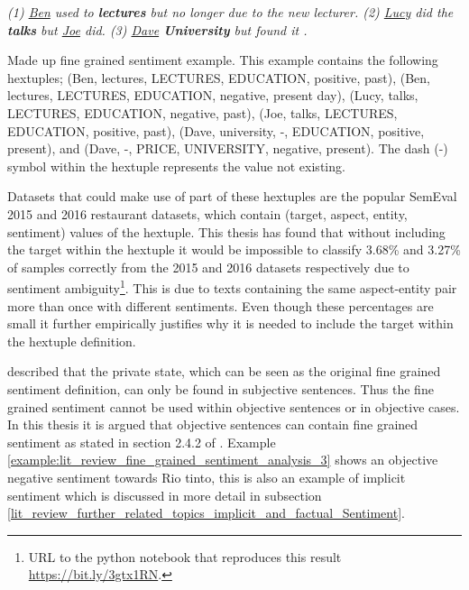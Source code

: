 \begin{example}
\textit{(1) \underline{Ben} used to  \textbf{lectures} but no longer due to the new lecturer. (2) \underline{Lucy} did  the \textbf{talks} but \underline{Joe} did. (3) \underline{Dave}  \textbf{University} but found it .}
\caption{Made up fine grained sentiment example. This example contains the following hextuples; (Ben, lectures, LECTURES, EDUCATION, positive, past), (Ben, lectures, LECTURES, EDUCATION, negative, present day), (Lucy, talks, LECTURES, EDUCATION, negative, past), (Joe, talks, LECTURES, EDUCATION, positive, past), (Dave, university, -, EDUCATION, positive, present), and (Dave, -, PRICE, UNIVERSITY, negative, present). The dash (-) symbol within the hextuple represents the value not existing.}
\label{example:lit_review_fine_grained_sentiment_analysis_2}
\end{example}

Datasets that could make use of part of these hextuples are the popular SemEval 2015 and 2016 restaurant datasets, which contain (target, aspect, entity, sentiment) values of the hextuple. This thesis has found that without including the target within the hextuple it would be impossible to classify 3.68\% and 3.27\% of samples correctly from the 2015 and 2016 datasets respectively due to sentiment ambiguity\footnote{URL to the python notebook that reproduces this result \url{https://bit.ly/3gtx1RN}.}. This is due to texts containing the same aspect-entity pair more than once with different sentiments. Even though these percentages are small it further empirically justifies why it is needed to include the target within the hextuple definition.

\citet{wiebe-1994-tracking} described that the private state, which can be seen as the original fine grained sentiment definition, can only be found in subjective sentences. Thus the fine grained sentiment cannot be used within objective sentences or in objective cases. In this thesis it is argued that objective sentences can contain fine grained sentiment as stated in section 2.4.2 of \citet{liu2015sentiment}. Example \ref{example:lit_review_fine_grained_sentiment_analysis_3} shows an objective negative sentiment towards Rio tinto, this is also an example of implicit sentiment which is discussed in more detail in subsection \ref{lit_review_further_related_topics_implicit_and_factual_Sentiment}.

